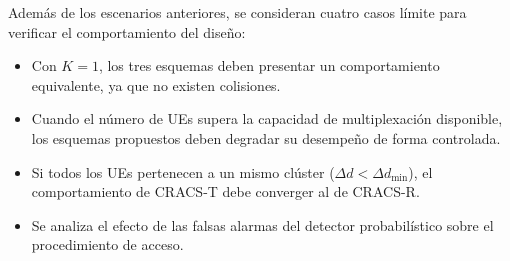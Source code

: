 Además de los escenarios anteriores, se consideran cuatro casos límite para verificar el comportamiento del diseño:

\begin{itemize}
    \item Con $K=1$, los tres esquemas deben presentar un comportamiento equivalente, ya que no existen colisiones.
    
    \item Cuando el número de UEs supera la capacidad de multiplexación disponible, los esquemas propuestos deben degradar su desempeño de forma controlada.
    
    \item Si todos los UEs pertenecen a un mismo clúster ($\Delta d < \Delta d_{\min}$), el comportamiento de CRACS-T debe converger al de CRACS-R.
    
    \item Se analiza el efecto de las falsas alarmas del detector probabilístico sobre el procedimiento de acceso.
\end{itemize}